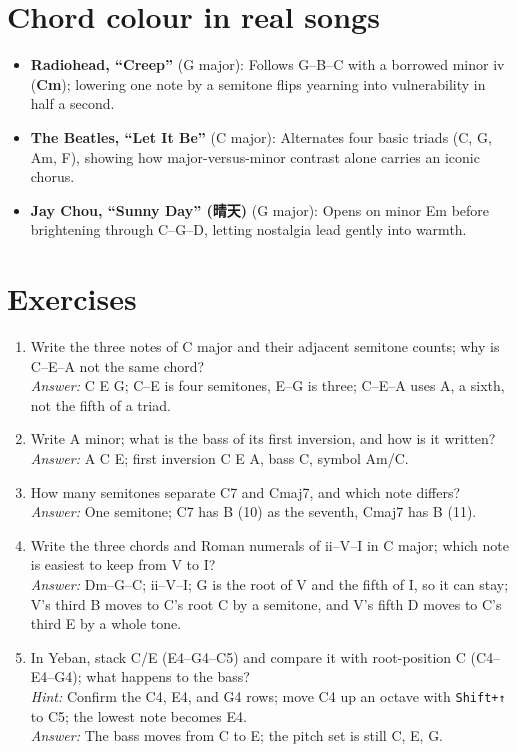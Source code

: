 \section{Chord colour in real songs}

\begin{itemize}
  \item \textbf{Radiohead, ``Creep''} (G major): Follows G--B--C with a borrowed minor iv (\textbf{Cm}); lowering one note by a semitone flips yearning into vulnerability in half a second.
  \item \textbf{The Beatles, ``Let It Be''} (C major): Alternates four basic triads (C, G, Am, F), showing how major-versus-minor contrast alone carries an iconic chorus.
  \item \textbf{Jay Chou, ``Sunny Day'' (晴天)} (G major): Opens on minor Em before brightening through C--G--D, letting nostalgia lead gently into warmth.
\end{itemize}

\section{Exercises}


\begin{exercise}
\begin{enumerate}
  \item Write the three notes of C major and their adjacent semitone counts; why is C--E--A not the same chord?\\
  \emph{Answer:} C E G; C--E is four semitones, E--G is three; C--E--A uses A, a sixth, not the fifth of a triad.

  \item Write A minor; what is the bass of its first inversion, and how is it written?\\
  \emph{Answer:} A C E; first inversion C E A, bass C, symbol Am/C.

  \item How many semitones separate C7 and Cmaj7, and which note differs?\\
  \emph{Answer:} One semitone; C7 has B\flatsym{} (10) as the seventh, Cmaj7 has B (11).

  \item Write the three chords and Roman numerals of ii--V--I in C major; which note is easiest to keep from V to I?\\
  \emph{Answer:} Dm--G--C; ii--V--I; G is the root of V and the fifth of I, so it can stay; V's third B moves to C's root C by a semitone, and V's fifth D moves to C's third E by a whole tone.

  \item In Yeban, stack C/E (E4--G4--C5) and compare it with root-position C (C4--E4--G4); what happens to the bass?\\
  \emph{Hint:} Confirm the C4, E4, and G4 rows; move C4 up an octave with \texttt{Shift+↑} to C5; the lowest note becomes E4.\\
  \emph{Answer:} The bass moves from C to E; the pitch set is still C, E, G.
\end{enumerate}
\end{exercise}

